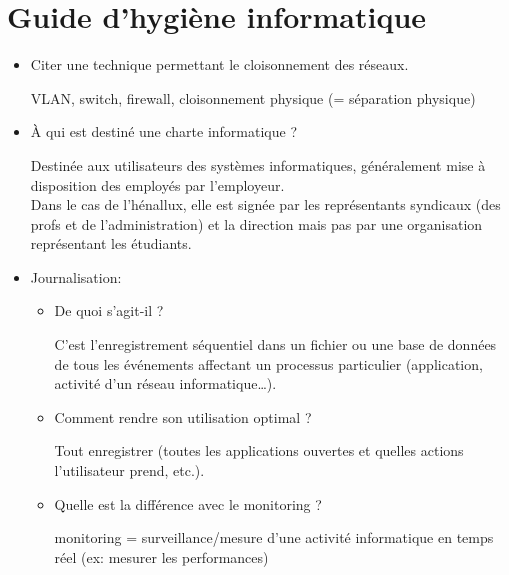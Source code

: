 \documentclass[a4paper]{article}
\begin{document}
\section{Guide d’hygiène informatique}





\begin{itemize}





\item Citer une technique permettant le cloisonnement des réseaux.
\begin{example}
    VLAN, switch, firewall, cloisonnement physique (= séparation physique)
\end{example}





\item À qui est destiné une charte informatique ?
\begin{example}
    Destinée aux utilisateurs des systèmes informatiques, généralement mise à disposition des employés par l'employeur. \\
    Dans le cas de l'hénallux, elle est signée par les représentants syndicaux (des profs et de l'administration) et la direction mais pas par une organisation représentant les étudiants.
\end{example}





\item Journalisation:
\begin{itemize}
    \item De quoi s'agit-il ?
    \begin{example}
        C'est l'enregistrement séquentiel dans un fichier ou une base de données de tous les événements affectant un processus particulier (application, activité d'un réseau informatique…).
    \end{example}
    \item Comment rendre son utilisation optimal ?
    \begin{example}
        Tout enregistrer (toutes les applications ouvertes et quelles actions l'utilisateur prend, etc.).
    \end{example}
    \item Quelle est la différence avec le monitoring ?
    \begin{example}
        monitoring = surveillance/mesure d'une activité informatique en temps réel (ex: mesurer les performances)


\end{example}
\end{itemize}
\end{itemize}
\end{document}
